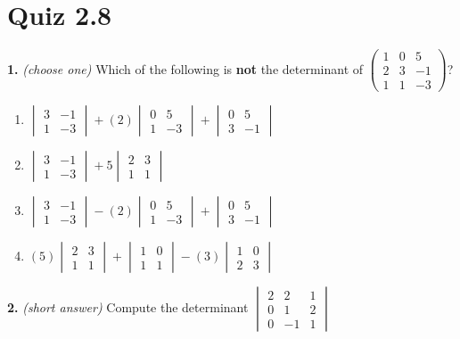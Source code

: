 \documentclass[10pt,a4paper]{article}
\begin{document}
\section{Quiz 2.8}
\textbf{1.} \textit{(choose one)} Which of the following is \textbf{not} the determinant of \(\begin{pmatrix}1&0&5\\2&3&-1\\1&1&-3\end{pmatrix}\)?

\begin{enumerate}[label=(\Alph*)]
\item \(\begin{vmatrix}3&-1\\1&-3\end{vmatrix}+(2)\begin{vmatrix}0&5\\1&-3\end{vmatrix}+\begin{vmatrix}0&5\\3&-1\end{vmatrix}\)
\item \(\begin{vmatrix}3&-1\\1&-3\end{vmatrix}+5\begin{vmatrix}2&3\\1&1\end{vmatrix}\)
\item \(\begin{vmatrix}3&-1\\1&-3\end{vmatrix}-(2)\begin{vmatrix}0&5\\1&-3\end{vmatrix}+\begin{vmatrix}0&5\\3&-1\end{vmatrix}\)
\item \((5)\begin{vmatrix}2&3\\1&1\end{vmatrix}+\begin{vmatrix}1&0\\1&1\end{vmatrix}-(3)\begin{vmatrix}1&0\\2&3\end{vmatrix}\)
\end{enumerate}
\smallskip
\textbf{2.} \textit{(short answer)} Compute the determinant \(\begin{vmatrix}2&2&1\\0&1&2\\0&-1&1\end{vmatrix}\)
\end{document}
